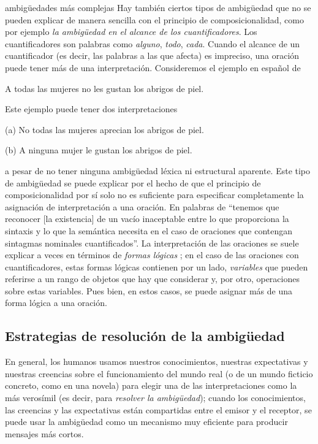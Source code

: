 \begin{persabermes}{ambigüedades más complejas} Hay también ciertos tipos de ambigüedad que no se pueden explicar de manera sencilla con el principio de composicionalidad, como por ejemplo {\em la ambigüedad en el alcance de los cuantificadores}. Los cuantificadores son palabras como \emph{alguno}, \emph{todo}, \emph{cada}. Cuando el alcance de un cuantificador (es decir, las palabras a las que afecta) es impreciso, una oración puede tener más de una interpretación. Consideremos el ejemplo en español de \cite{hutchins92b} \begin{exemple} A todas las mujeres no les gustan los abrigos de piel. \label{eq:abric} \end{exemple} Este ejemplo puede tener dos interpretaciones \begin{exemple} \item[(a)] No todas las mujeres aprecian los abrigos de piel. \item[(b)] A ninguna mujer le gustan los abrigos de piel. \end{exemple} a pesar de no tener ninguna ambigüedad léxica ni estructural aparente. Este tipo de ambigüedad se puede explicar por el hecho de que el principio de composicionalidad por sí solo no es suficiente para especificar completamente la asignación de interpretación a una oración. En palabras de \citet[p.364]{radford99b} ``tenemos que reconocer [la existencia] de un vacío inaceptable entre lo que proporciona la sintaxis y lo que la semántica necesita en el caso de oraciones que contengan sintagmas nominales cuantificados''. La interpretación de las oraciones se suele explicar a veces en términos de {\em formas lógicas} \citep[cap. 23]{radford09b}; en el caso de las oraciones con cuantificadores, estas formas lógicas contienen por un lado, \emph{variables} que pueden referirse a un rango de objetos que hay que considerar y, por otro, operaciones sobre estas variables. Pues bien, en estos casos, se puede asignar más de una forma lógica a una oración. 

\mbox{} 

\end{persabermes} 

\subsection{Estrategias de resolución de la ambigüedad} En general, los humanos usamos nuestros conocimientos, nuestras expectativas y nuestras creencias sobre el funcionamiento del mundo real (o de un mundo ficticio concreto, como en una novela) para elegir una de las interpretaciones como la más verosímil (es decir, para \emph{resolver la ambigüedad}); cuando los conocimientos, las creencias y las expectativas están compartidas entre el emisor y el receptor, se puede usar la ambigüedad como un mecanismo muy eficiente para producir mensajes más cortos. 


